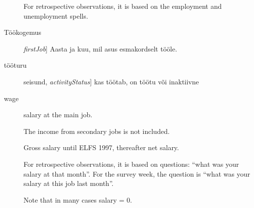 \documentclass[a4paper]{article}
\begin{document}
\begin{description}
  For retrospective observations, it is based on the employment and
  unemployment spells.
\item[Töökogemus] \textit{firstJob}] Aasta ja kuu, mil asus esmakordselt tööle.
\item[tööturu] seisund, \textit{activityStatus}] kas töötab, on töötu või
inaktiivne
\item[wage] salary at the main job.

  The income from secondary jobs is not included.

  Gross salary until ELFS 1997, thereafter net salary.

  For retrospective observations, it is based on questions: ``what was
  your salary at that month''.  For the survey week, the question is
  ``what was your salary at this job last month''.

  Note that in many cases salary = 0.
\end{description}
\end{document}
